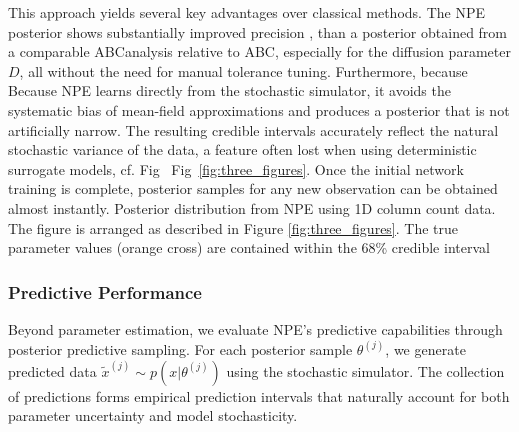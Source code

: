 \documentclass{article}
\providecommand{\DIFaddtex}[1]{{\protect\color{blue} \sf #1}} %
\providecommand{\DIFdeltex}[1]{{\protect\color{red} \scriptsize #1}} %
\providecommand{\DIFaddbegin}{} %
\providecommand{\DIFaddend}{} %
\providecommand{\DIFdelbegin}{} %
\providecommand{\DIFdelend}{} %
\providecommand{\DIFdelFL}[1]{\DIFdel{#1}} %
\providecommand{\DIFadd}[1]{\texorpdfstring{\DIFaddtex{#1}}{#1}} %
\providecommand{\DIFdel}[1]{\texorpdfstring{\DIFdeltex{#1}}{}} %
\newcommand{\DIFscaledelfig}{0.5}
\newlength{\DIFdelgraphicswidth} %
\newlength{\DIFdelgraphicsheight} %
\newcommand{\DIFaddincludegraphics}[2][]{{\color{blue}\fbox{\DIFOincludegraphics[#1]{#2}}}} %
\newcommand{\DIFdelincludegraphics}[2][]{%
\sbox{\DIFdelgraphicsbox}{\DIFOincludegraphics[#1]{#2}}%
\settoboxwidth{\DIFdelgraphicswidth}{\DIFdelgraphicsbox} %
\settoboxtotalheight{\DIFdelgraphicsheight}{\DIFdelgraphicsbox} %
\scalebox{\DIFscaledelfig}{%
\parbox[b]{\DIFdelgraphicswidth}{\usebox{\DIFdelgraphicsbox}\\[-\baselineskip] \rule{\DIFdelgraphicswidth}{0em}}\llap{\resizebox{\DIFdelgraphicswidth}{\DIFdelgraphicsheight}{%
\setlength{\unitlength}{\DIFdelgraphicswidth}%
\begin{picture}(1,1)%
\thicklines\linethickness{2pt} %
{\color[rgb]{1,0,0}\put(0,0){\framebox(1,1){}}}%
{\color[rgb]{1,0,0}\put(0,0){\line( 1,1){1}}}%
{\color[rgb]{1,0,0}\put(0,1){\line(1,-1){1}}}%
\end{picture}%
}\hspace*{3pt}}} %
} %
\DeclareRobustCommand{\DIFaddbegin}{\DIFOaddbegin \let\includegraphics\DIFaddincludegraphics} %
\DeclareRobustCommand{\DIFaddend}{\DIFOaddend \let\includegraphics\DIFOincludegraphics} %
\DeclareRobustCommand{\DIFdelbegin}{\DIFOdelbegin \let\includegraphics\DIFdelincludegraphics} %
\DeclareRobustCommand{\DIFdelend}{\DIFOaddend \let\includegraphics\DIFOincludegraphics} %
\begin{document}
This approach yields several key advantages over classical methods. The NPE posterior shows substantially improved precision \DIFdelbegin \DIFdel{, than a posterior obtained from a comparable ABCanalysis}\DIFdelend \DIFaddbegin \DIFadd{relative to ABC}\DIFaddend , especially for the diffusion parameter $D$, all without the need for manual tolerance tuning. \DIFdelbegin \DIFdel{Furthermore, because }\DIFdelend \DIFaddbegin \DIFadd{Because }\DIFaddend NPE learns directly from the stochastic simulator, it avoids the systematic bias of mean-field approximations and produces a posterior that is not artificially narrow. The resulting credible intervals accurately reflect the natural stochastic variance of the data, a feature often lost when using deterministic surrogate models, cf.\DIFdelbegin \DIFdel{Fig }\DIFdelend \DIFaddbegin \DIFadd{\ Fig~}\DIFaddend \ref{fig:three_figures}. Once the initial network training is complete, posterior samples for any new observation can be obtained almost instantly.
\DIFdelbegin %
{%
\DIFdelFL{Posterior distribution from NPE using 1D column count data. 
		The figure is arranged as described in Figure \ref{fig:three_figures}. The true parameter values (orange cross) are contained within the 68\% credible interval}}
\DIFdelend 

\DIFdelbegin \subsubsection{\DIFdel{Predictive Performance}}%
\addtocounter{subsubsection}{-1}%

\DIFdel{Beyond parameter estimation, we evaluate NPE's predictive capabilities through posterior predictive sampling. For each posterior sample $\theta^{(j)}$, we generate predicted data $\tilde{x}^{(j)} \sim p(x|\theta^{(j)})$ using the stochastic simulator. The collection of predictions forms empirical prediction intervals that naturally account for both parameter uncertainty and model stochasticity.
}%
\end{document}
